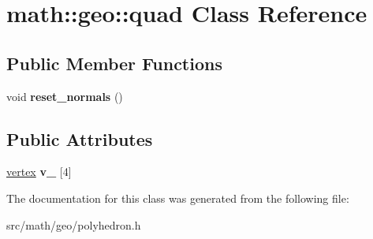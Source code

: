 \hypertarget{classmath_1_1geo_1_1quad}{
\section{math::geo::quad Class Reference}
\label{classmath_1_1geo_1_1quad}
}
\subsection*{Public Member Functions}
\begin{DoxyCompactItemize}
\item 
\hypertarget{classmath_1_1geo_1_1quad_a61f7422d3d82b7acab0aabd71b68fccf}{
void {\bfseries reset\_\-normals} ()}
\label{classmath_1_1geo_1_1quad_a61f7422d3d82b7acab0aabd71b68fccf}

\end{DoxyCompactItemize}
\subsection*{Public Attributes}
\begin{DoxyCompactItemize}
\item 
\hypertarget{classmath_1_1geo_1_1quad_a6625bbd8467b8a853aae1f4f2a2362ec}{
\hyperlink{classmath_1_1geo_1_1vertex}{vertex} {\bfseries v\_\-} \mbox{[}4\mbox{]}}
\label{classmath_1_1geo_1_1quad_a6625bbd8467b8a853aae1f4f2a2362ec}

\end{DoxyCompactItemize}


The documentation for this class was generated from the following file:\begin{DoxyCompactItemize}
\item 
src/math/geo/polyhedron.h\end{DoxyCompactItemize}

